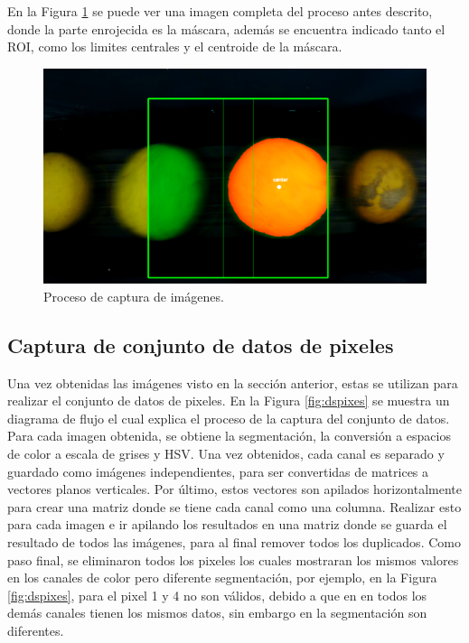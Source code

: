 \documentclass[twoside,spanish,ESP,MSc]{plantillaLabUPV}
\theoremstyle{definition}
\begin{document}
En la Figura \ref{fig:framito} se puede ver una imagen completa del proceso antes descrito, donde la parte enrojecida es la máscara, además se encuentra indicado tanto el ROI, como los limites centrales y el centroide de la máscara.

\begin{figure}
	\centering
	\includegraphics[width=0.7\linewidth]{framito}
	\caption{Proceso de captura de imágenes.}
	\label{fig:framito}
\end{figure}


\subsection{Captura de conjunto de datos de pixeles}
Una vez obtenidas las imágenes visto en la sección anterior, estas se utilizan para realizar el conjunto de datos de pixeles. En la Figura \ref{fig:dspixes} se muestra un diagrama de flujo el cual explica el proceso de la captura del conjunto de datos. Para cada imagen obtenida, se obtiene la segmentación, la conversión a espacios de color a escala de grises y HSV. Una vez obtenidos, cada canal es separado y guardado como imágenes independientes, para ser convertidas de matrices a vectores planos verticales. Por último, estos vectores son apilados horizontalmente para crear una matriz donde se tiene cada canal como una columna. Realizar esto para cada imagen e ir apilando los resultados en una matriz donde se guarda el resultado de todos las imágenes, para al final remover todos los duplicados. Como paso final, se eliminaron todos los pixeles los cuales mostraran los mismos valores en los canales de color pero diferente segmentación, por ejemplo, en la Figura \ref{fig:dspixes}, para el pixel 1 y 4 no son válidos, debido a que en en todos los demás canales tienen los mismos datos, sin embargo en la segmentación son diferentes.

\end{document}

